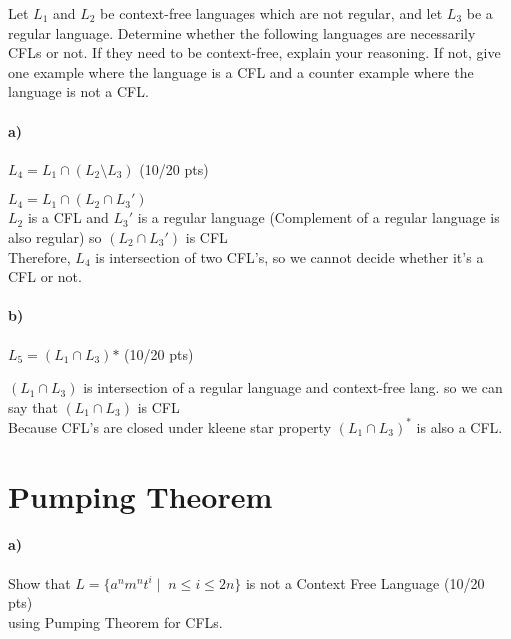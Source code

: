 \documentclass[a4paper,12pt]{article}
\begin{document}
Let $L_1$ and $L_2$ be context-free languages which are not regular, and let $L_3$ be a regular language. Determine whether the following languages are necessarily CFLs or not. If they need to be context-free, explain your reasoning. If not, give one example where the language is a CFL and a counter example where the language is not a CFL. \\

\paragraph{a)} $L_4 = L_1 \cap (L_2 \setminus L_3)$ \hfill \small{(10/20 pts)} \\

\begin{tcolorbox}
$L_4 = L_1 \cap (L_2 \cap L_3')$ \\
$L_2$ is a CFL and $L_3'$ is a regular language (Complement of a regular language is also regular) so $(L_2 \cap L_3')$ is CFL \\
Therefore, $L_4$ is intersection of two CFL's, so we cannot decide whether it's a CFL or not.
\end{tcolorbox}

\paragraph{b)} $L_5 = (L_1 \cap L_3)\text{*}$ \hfill \small{(10/20 pts)} \\

\begin{tcolorbox}
$(L_1 \cap L_3)$ is intersection of a regular language and context-free lang. so we can say that $(L_1 \cap L_3)$ is CFL \\
Because CFL's are closed under kleene star property $(L_1 \cap L_3)^*$ is also a CFL.
\end{tcolorbox}





\newpage
\section{Pumping Theorem \hfill {}}

\paragraph{a)} Show that $L=\{a^n m^n t^i \mid \; n\leq i \leq 2n\}$ is not a Context Free Language \hfill \small{(10/20 pts)} \\
using Pumping Theorem for CFLs. \\
\end{document}
